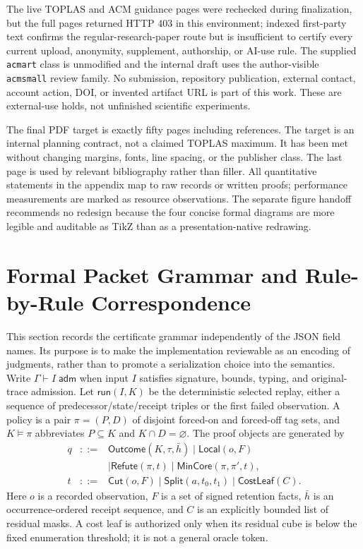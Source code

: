The live TOPLAS and ACM guidance pages were rechecked during finalization, but the
full pages returned HTTP 403 in this environment; indexed first-party text confirms
the regular-research-paper route but is insufficient to certify every current upload,
anonymity, supplement, authorship, or AI-use rule.  The supplied \texttt{acmart}
class is unmodified and the internal draft uses the author-visible \texttt{acmsmall}
review family.  No submission, repository publication, external contact, account
action, DOI, or invented artifact URL is part of this work.  These are external-use
holds, not unfinished scientific experiments.

The final PDF target is exactly fifty pages including references.  The target is an
internal planning contract, not a claimed TOPLAS maximum.  It has been met without
changing margins, fonts, line spacing, or the publisher class.  The last page is used
by relevant bibliography rather than filler.  All quantitative statements in the
appendix map to raw records or written proofs; performance measurements are marked as
resource observations.  The separate figure handoff recommends no redesign because
the four concise formal diagrams are more legible and auditable as TikZ than as a
presentation-native redrawing.

\section{Formal Packet Grammar and Rule-by-Rule Correspondence}
\label{app:packet-grammar}

This section records the certificate grammar independently of the JSON field names.
Its purpose is to make the implementation reviewable as an encoding of judgments,
rather than to promote a serialization choice into the semantics.  Write
$\Gamma\vdash I\;\mathsf{adm}$ when input $I$ satisfies signature, bounds, typing,
and original-trace admission.  Let $\mathsf{run}(I,K)$ be the deterministic selected
replay, either a sequence of predecessor/state/receipt triples or the first failed
observation.  A policy is a pair $\pi=(P,D)$ of disjoint forced-on and forced-off tag
sets, and $K\models\pi$ abbreviates $P\subseteq K$ and $K\cap D=\varnothing$.
The proof objects are generated by
\[
\begin{array}{rcl}
 q &::=& \mathsf{Outcome}(K,\tau,\bar h)
       \mid \mathsf{Local}(o,F)\\
   && \mid \mathsf{Refute}(\pi,t)
       \mid \mathsf{MinCore}(\pi,\pi',t),\\[2pt]
 t &::=& \mathsf{Cut}(o,F)
       \mid \mathsf{Split}(a,t_0,t_1)
       \mid \mathsf{CostLeaf}(C).
\end{array}
\]
Here $o$ is a recorded observation, $F$ is a set of signed retention facts,
$\bar h$ is an occurrence-ordered receipt sequence, and $C$ is an explicitly
bounded list of residual masks.  A cost leaf is authorized only when its residual
cube is below the fixed enumeration threshold; it is not a general oracle token.

